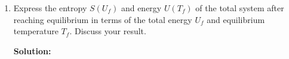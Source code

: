 \documentclass[10pt]{article}
\newenvironment{Solution}
    {\textbf{Solution:}
    
    \vspace{5mm}
    \begin{tcolorbox}
    }
    {
    \end{tcolorbox}
    \vspace{5mm}
    }
\begin{document}
\begin{enumerate}
\begin{enumerate}
\begin{Solution}


\end{Solution}

\item Express the entropy $S\left(U_{f}\right)$ and energy $U\left(T_{f}\right)$ of the total system after reaching equilibrium in terms of the total energy $U_{f}$ and equilibrium temperature $T_{f} .$ Discuss your result.

\begin{Solution}


\end{Solution}
    
\end{enumerate}
\end{enumerate}
\end{document}
